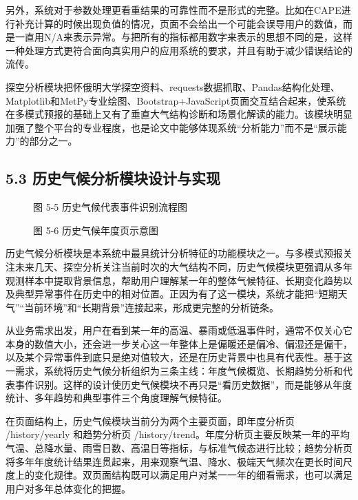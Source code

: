 另外，系统对于参数处理更看重结果的可靠性而不是形式的完整。比如在CAPE进行补充计算的时候出现负值的情况，页面不会给出一个可能会误导用户的数值，而是一直用N/A来表示异常。与把所有的指标都用数字来表示的思想不同的是，这样一种处理方式更符合面向真实用户的应用系统的要求，并且有助于减少错误结论的流传。

探空分析模块把怀俄明大学探空资料、requests数据抓取、Pandas结构化处理、Matplotlib和MetPy专业绘图、Bootstrap+JavaScript页面交互结合起来，使系统在多模式预报的基础上又有了垂直大气结构诊断和场景化解读的能力。该模块明显加强了整个平台的专业程度，也是论文中能够体现系统“分析能力”而不是“展示能力”的部分之一。

\subsection{5.3 历史气候分析模块设计与实现}

\begin{figure}[htbp]
\centering
\caption{图 5-5  历史气候代表事件识别流程图}
\label{fig:5-5}
\end{figure}

\begin{figure}[htbp]
\centering
\caption{图 5-6  历史气候年度页示意图}
\label{fig:5-6}
\end{figure}

历史气候分析模块是本系统中最具统计分析特征的功能模块之一。与多模式预报关注未来几天、探空分析关注当前时次的大气结构不同，历史气候模块更强调从多年观测样本中提取背景信息，帮助用户理解某一年的整体气候特征、长期变化趋势以及典型异常事件在历史中的相对位置。正因为有了这一模块，系统才能把“短期天气”“当前环境”和“长期背景”连接起来，形成更完整的分析链条。

从业务需求出发，用户在看到某一年的高温、暴雨或低温事件时，通常不仅关心它本身的数值大小，还会进一步关心这一年整体上是偏暖还是偏冷、偏湿还是偏干，以及某个异常事件到底只是绝对值较大，还是在历史背景中也具有代表性。基于这一需求，系统将历史气候分析组织为三条主线：年度气候概览、长期趋势分析和代表事件识别。这样的设计使历史气候模块不再只是“看历史数据”，而是能够从年度统计、多年趋势和典型事件三个角度理解气候特征。

在页面结构上，历史气候模块当前分为两个主要页面，即年度分析页 /history/yearly 和趋势分析页 /history/trend。年度分析页主要反映某一年的平均气温、总降水量、雨雪日数、高温日等指标，与标准气候态进行比较；趋势分析页将多年年度统计结果连贯起来，用来观察气温、降水、极端天气频次在更长时间尺度上的变化规律。双页面结构既可以满足用户对某一一年的细看需求，也可以满足用户对多年总体变化的把握。

